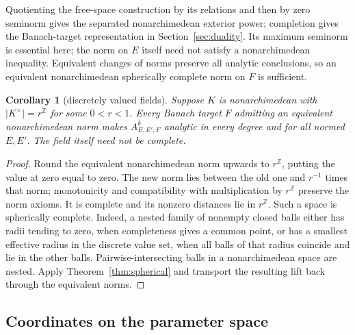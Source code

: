 \documentclass[11pt]{amsart}
\newtheorem{corollary}[theorem]{Corollary}
\theoremstyle{definition}
\theoremstyle{remark}
\numberwithin{equation}{section}
\newcommand{\Z}{\mathbb Z}
\newcommand{\abs}[1]{\lvert #1\rvert}
\begin{document}
Quotienting the free-space construction by its relations and then by zero seminorm gives the separated nonarchimedean exterior power; completion gives the Banach-target representation in Section~\ref{sec:duality}. Its maximum seminorm is essential here; the norm on $E$ itself need not satisfy a nonarchimedean inequality. Equivalent changes of norms preserve all analytic conclusions, so an equivalent nonarchimedean spherically complete norm on $F$ is sufficient.

\begin{corollary}[discretely valued fields]\label{cor:discrete-targets}
Suppose $K$ is nonarchimedean with $\abs{K^\times}=r^\Z$ for some $0<r<1$.
Every Banach target $F$ admitting an equivalent nonarchimedean norm makes $A^k_{E,E';F}$
analytic in every degree and for all normed $E,E'$. The field itself need not be complete.
\end{corollary}
\begin{proof}
Round the equivalent nonarchimedean norm upwards to $r^\Z$, putting the value at zero equal to zero.
The new norm lies between the old one and $r^{-1}$ times that norm; monotonicity and compatibility
with multiplication by $r^\Z$ preserve the norm axioms. It is complete and its nonzero distances
lie in $r^\Z$. Such a space is spherically complete. Indeed, a nested family of nonempty closed balls
either has radii tending to zero, when completeness gives a common point, or has a smallest effective
radius in the discrete value set, when all balls of that radius coincide and lie in the other balls.
Pairwise-intersecting balls in a nonarchimedean space are nested. Apply Theorem~\ref{thm:spherical}
and transport the resulting lift back through the equivalent norms.
\end{proof}

\subsection{Coordinates on the parameter space}
\end{document}
